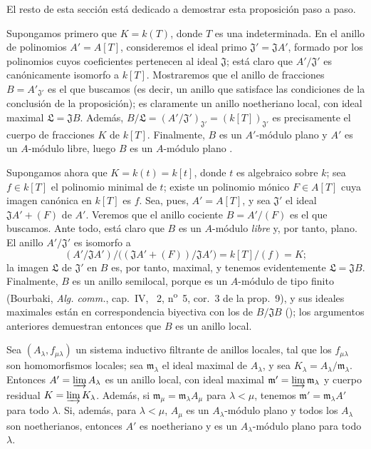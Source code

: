 \documentclass[oneside]{amsart}
\newcommand{\oldpage}[2][]{{\marginnote{\normalfont\textbf{#1}~|~#2}}\ignorespaces}
\let\EGAOriginalLabel\label
\renewcommand{\label}[1]{\phantomsection\EGAOriginalLabel{#1}}
\begin{document}
El resto de esta sección está dedicado a demostrar esta proposición paso a paso.
\begin{env}[10.3.1.1]
\label{0.10.3.1.1}
Supongamos primero que $K=k(T)$, donde $T$ es una indeterminada.
En el anillo de polinomios $A'=A[T]$, consideremos el ideal primo $\mathfrak{J}'=\mathfrak{J}A'$, formado por los
\oldpage[0\textsubscript{III-1}]{21}
polinomios cuyos coeficientes pertenecen al ideal $\mathfrak{J}$;
está claro que $A'/\mathfrak{J}'$ es canónicamente isomorfo a $k[T]$.
Mostraremos que el anillo de fracciones $B=A'_{\mathfrak{J}'}$ es el que buscamos (es decir, un anillo que satisface las condiciones de la conclusión de la proposición);
es claramente un anillo noetheriano local, con ideal maximal $\mathfrak{L}=\mathfrak{J}B$.
Además, $B/\mathfrak{L}=(A'/\mathfrak{J}')_{\mathfrak{J}'}=(k[T])_{\mathfrak{J}'}$ es precisamente el cuerpo de fracciones $K$ de $k[T]$.
Finalmente, $B$ es un $A'$-módulo plano y $A'$ es un $A$-módulo libre, luego $B$ es un $A$-módulo plano .
\end{env}

\begin{env}[10.3.1.2]
\label{0.10.3.1.2}
Supongamos ahora que $K=k(t)=k[t]$, donde $t$ es algebraico sobre $k$;
sea $f\in k[T]$ el polinomio minimal de $t$;
existe un polinomio mónico $F\in A[T]$ cuya imagen canónica en $k[T]$ es $f$.
Sea, pues, $A'=A[T]$, y sea $\mathfrak{J}'$ el ideal $\mathfrak{J}A'+(F)$ de $A'$.
Veremos que el anillo cociente $B=A'/(F)$ es el que buscamos.
Ante todo, está claro que $B$ es un $A$-módulo \emph{libre} y, por tanto, plano.
El anillo $A'/\mathfrak{J}'$ es isomorfo a
\[
  (A'/\mathfrak{J}A')/\big((\mathfrak{J}A'+(F))/\mathfrak{J}A'\big)=k[T]/(f)=K;
\]
la imagen $\mathfrak{L}$ de $\mathfrak{J}'$ en $B$ es, por tanto, maximal, y tenemos evidentemente $\mathfrak{L}=\mathfrak{J}B$.
Finalmente, $B$ es un anillo semilocal, porque es un $A$-módulo de tipo finito (Bourbaki, \emph{Alg. comm.}, cap.~IV, \textsection~2, n\textsuperscript{o}~5, cor.~3 de la prop.~9), y sus ideales maximales están en correspondencia biyectiva con los de $B/\mathfrak{J}B$ (\cite[vol.~I, p.~259]{I-13});
los argumentos anteriores demuestran entonces que $B$ es un anillo local.
\end{env}

\begin{lemma}[10.3.1.3]
\label{0.10.3.1.3}
Sea $(A_\lambda,f_{\mu\lambda})$ un sistema inductivo filtrante de anillos locales, tal que los $f_{\mu\lambda}$ son homomorfismos locales;
sea $\mathfrak{m}_\lambda$ el ideal maximal de $A_\lambda$, y sea $K_\lambda=A_\lambda/\mathfrak{m}_\lambda$.
Entonces $A'=\varinjlim A_\lambda$ es un anillo local, con ideal maximal $\mathfrak{m}'=\varinjlim\mathfrak{m}_\lambda$ y cuerpo residual $K=\varinjlim K_\lambda$.
Además, si $\mathfrak{m}_\mu=\mathfrak{m}_\lambda A_\mu$ para $\lambda<\mu$, tenemos $\mathfrak{m}'=\mathfrak{m}_\lambda A'$ para todo $\lambda$.
Si, además, para $\lambda<\mu$, $A_\mu$ es un $A_\lambda$-módulo plano y todos los $A_\lambda$ son noetherianos, entonces $A'$ es noetheriano y es un $A_\lambda$-módulo plano para todo $\lambda$.
\end{lemma}
\end{document}
